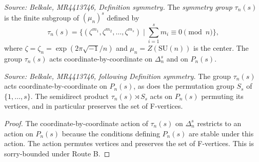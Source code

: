 \begin{definition}[TauGroup]
  \label{def:tau-n-s}
  \textit{Source: Belkale, MR4413746, Definition symmetry.}
  The \emph{symmetry group} \(\tau_n(s)\) is the finite subgroup of \((\mu_n)^s\) defined by
  \[
    \tau_n(s) = \bigl\{ (\zeta^{m_1}, \zeta^{m_2}, \ldots, \zeta^{m_s}) \mid \textstyle\sum_{i=1}^s m_i \equiv 0 \pmod{n} \bigr\},
  \]
  where \(\zeta = \zeta_n = \exp(2\pi\sqrt{-1}/n)\) and \(\mu_n = Z(\mathrm{SU}(n))\) is the center. The group \(\tau_n(s)\) acts coordinate-by-coordinate on \(\Delta_n^s\) and on \(P_n(s)\).
\end{definition}

\begin{lemma}[TauActsFVertex]
  \label{lem:tau-acts-fvertex}
  \textit{Source: Belkale, MR4413746, following Definition symmetry.}
  The group \(\tau_n(s)\) acts coordinate-by-coordinate on \(P_n(s)\), as does the permutation group \(S_s\) of \(\{1, \ldots, s\}\). The semidirect product \(\tau_n(s) \rtimes S_s\) acts on \(P_n(s)\) permuting its vertices, and in particular preserves the set of F-vertices.
\end{lemma}

\begin{proof}
  The coordinate-by-coordinate action of \(\tau_n(s)\) on \(\Delta_n^s\) restricts to an action on \(P_n(s)\) because the conditions defining \(P_n(s)\) are stable under this action. The action permutes vertices and preserves the set of F-vertices. This is sorry-bounded under Route B.
\end{proof}

